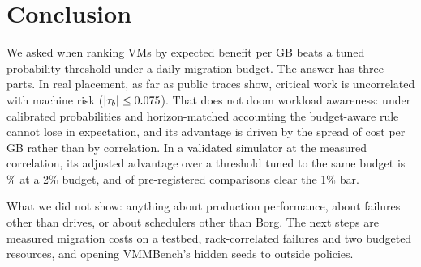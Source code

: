 \section{Conclusion}
\label{sec:conclusion}

We asked when ranking VMs by expected benefit per GB beats a tuned probability threshold under a
daily migration budget. The answer has three parts. In real placement, as far as public traces
show, critical work is uncorrelated with machine risk ($|\tau_b| \le 0.075$). That does
not doom workload awareness: under calibrated probabilities and horizon-matched accounting the
budget-aware rule cannot lose in expectation, and its advantage is driven by the spread of cost per
GB rather than by correlation. In a validated simulator at the measured correlation, its adjusted
advantage over a threshold tuned to the same budget is \VDeltaPFourBOneTwo\% at a 2\% budget, and
\VWins{} of \VFamilySize{} pre-registered comparisons clear the 1\% bar.

What we did not show: anything about production performance, about failures other than drives,
or about schedulers other than Borg. The next steps are measured migration costs on a testbed,
rack-correlated failures and two budgeted resources, and opening VMMBench's hidden seeds to
outside policies.
